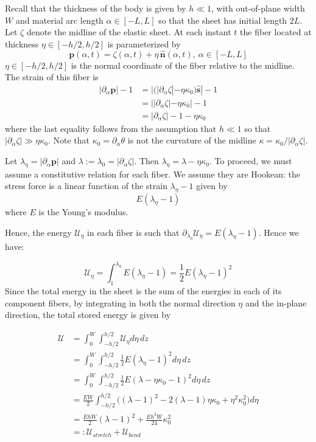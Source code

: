 \documentclass{article}[12pt]
\theoremstyle{Theorem}
\begin{document}
Recall that the thickness of the body is given by $h \ll 1$, with out-of-plane width $W$ and material arc length $\alpha \in [-L,L]$ so that the sheet has initial length $2L$. Let $\zeta$ denote the midline of the elastic sheet. At each instant $t$ the fiber located at thickness $\eta \in[-h/2,h/2]$ is parameterized by 
\begin{equation}
    \boldsymbol{p}(\alpha, t) = \zeta(\alpha, t) + \eta\,\hat{\boldsymbol{n}}(\alpha, t),\ \alpha \in [-L,L]
\end{equation}
$\eta \in[-h/2,h/2]$ is the normal coordinate of the fiber relative to the midline. The strain of this fiber is 
\begin{align}
    |\partial_\alpha\boldsymbol{p}| - 1 &= | \big(|\partial_\alpha\zeta|- \eta\kappa_0\big)\hat{\boldsymbol{s}}| -1 \\
    &=||\partial_\alpha\zeta|- \eta\kappa_0| - 1 \\
    &= |\partial_\alpha\zeta| -1- \eta\kappa_0
\end{align}
where the last equality follows from the assumption that $h \ll 1$ so that $|\partial_\alpha\zeta| \gg \eta\kappa_0$. Note that $\kappa_0 =\partial_\alpha\theta$ is not the curvature of the midline $\kappa = \kappa_0/|\partial_\alpha\zeta|$. 
\newline

Let $\lambda_\eta =|\partial_\alpha\boldsymbol{p}|$ and $\lambda:= \lambda_0=|\partial_\alpha\zeta|$. Then $\lambda_\eta =\lambda - \eta\kappa_0$. To proceed, we must assume a constitutive relation for each fiber. We assume they are Hookean: the stress force is a linear function of the strain $\lambda_\eta -1$ given by
\begin{equation}
    E(\lambda_\eta -1)
\end{equation}
where $E$ is the Young's modulus.

Hence, the energy $\mathcal{U}_\eta$ in each fiber is such that $\partial_{\lambda_\eta}\mathcal{U}_\eta = E(\lambda_\eta -1)$. Hence we have:

\begin{equation}
    \mathcal{U}_\eta = \int_1^{\lambda_\eta} E(\lambda_\eta -1) =\frac{1}{2}E(\lambda_\eta-1)^2
\end{equation}
Since the total energy in the sheet is the sum of the energies in each of its component fibers, by integrating in both the normal direction $\eta$ and the in-plane direction, the total stored energy is given by 

\begin{align}
    \mathcal{U} &=\int_0^W\int_{-h/2}^{h/2} \mathcal{U}_\eta d\eta\, dz \\
    &=\int_0^W\int_{-h/2}^{h/2}  \frac{1}{2}E(\lambda_\eta-1)^2d\eta\, dz \\
    &=\int_0^W\int_{-h/2}^{h/2}  \frac{1}{2}E(\lambda - \eta\kappa_0-1)^2d\eta\, dz \\
    &=\frac{EW}{2}\int_{-h/2}^{h/2}\big(  (\lambda -1)^2  - 2(\lambda-1)\eta\kappa_0 + \eta^2\kappa_0^2 \big)d\eta\\
    &=\frac{EhW}{2}(\lambda-1)^2+ \frac{Eh^3W}{24}\kappa_0^2 \\
    &=: \mathcal{U}_{stretch} + \mathcal{U}_{bend} 
\end{align}
\end{document}
